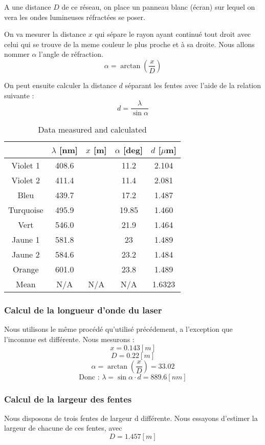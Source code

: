 \documentclass[a4paper,11pt]{article}
\begin{document}
	A une distance $D$ de ce réseau, on place un panneau blanc (écran) sur lequel on vera les ondes lumineuses réfractées se poser.
	
	On va mesurer la distance $x$ qui sépare le rayon ayant continué tout droit  avec celui qui se trouve de la meme couleur le plus proche et à sa droite. Nous allons nommer $\alpha$ l'angle de réfraction.
	$$ \alpha = \arctan (\frac{x}{D}) $$
	
	On peut ensuite calculer la distance $d$ séparant les fentes avec l'aide de la relation suivante :
	$$ d = \frac{\lambda}{\sin \alpha} $$


	\begin{table}[!h]
	\begin{center}
	\begin{tabular}{|c|c|c|c|c|}
	\hline
		& $\lambda$ [nm] & $x$ [m] & $\alpha$ [deg] & $d$ [$\mu $m] \\
	\hline
		Violet 1 & 408.6 & & 11.2 & 2.104\\
		Violet 2 & 411.4 & & 11.4 & 2.081\\
		Bleu & 439.7 & & 17.2 & 1.487\\
		Turquoise & 495.9 & & 19.85 & 1.460\\
		Vert & 546.0 & & 21.9 & 1.464 \\
		Jaune 1 & 581.8 & & 23 & 1.489 \\
		Jaune 2 & 584.6 & & 23.2 & 1.484\\
		Orange & 601.0 & & 23.8 & 1.489\\
	\hline
		Mean & N/A & N/A & N/A &1.6323 \\
	\hline
	
	\end{tabular}
	\caption{Data measured and calculated}
	\end{center}
	\end{table}

\subsubsection{Calcul de la longueur d'onde du laser}
	Nous utilisons le même procédé qu'utilisé précédement, a l'exception que l'inconnue est différente. Nous mesurons : 
	$$ x = 0.143 [m]$$
	$$ D = 0.22 [m]$$
	$$ \alpha = \arctan (\frac{x}{D}) = 33.02 $$
	$$ \text{Donc :    }  \lambda = \sin \alpha \cdot d = 889.6 [nm]$$
	
\subsubsection{Calcul de la largeur des fentes}
Nous disposons de trois fentes de largeur d différente.  Nous essayons d'estimer la largeur de chacune de ces fentes, avec 
$$ D = 1.457 [m]$$
\end{document}
